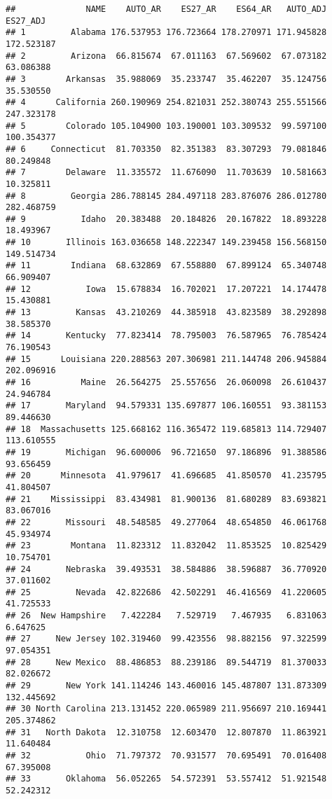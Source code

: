 \documentclass[
]{article}
\begin{document}
\begin{verbatim}
##              NAME    AUTO_AR    ES27_AR    ES64_AR   AUTO_ADJ   ES27_ADJ
## 1         Alabama 176.537953 176.723664 178.270971 171.945828 172.523187
## 2         Arizona  66.815674  67.011163  67.569602  67.073182  63.086388
## 3        Arkansas  35.988069  35.233747  35.462207  35.124756  35.530550
## 4      California 260.190969 254.821031 252.380743 255.551566 247.323178
## 5        Colorado 105.104900 103.190001 103.309532  99.597100 100.354377
## 6     Connecticut  81.703350  82.351383  83.307293  79.081846  80.249848
## 7        Delaware  11.335572  11.676090  11.703639  10.581663  10.325811
## 8         Georgia 286.788145 284.497118 283.876076 286.012780 282.468759
## 9           Idaho  20.383488  20.184826  20.167822  18.893228  18.493967
## 10       Illinois 163.036658 148.222347 149.239458 156.568150 149.514734
## 11        Indiana  68.632869  67.558880  67.899124  65.340748  66.909407
## 12           Iowa  15.678834  16.702021  17.207221  14.174478  15.430881
## 13         Kansas  43.210269  44.385918  43.823589  38.292898  38.585370
## 14       Kentucky  77.823414  78.795003  76.587965  76.785424  76.190543
## 15      Louisiana 220.288563 207.306981 211.144748 206.945884 202.096916
## 16          Maine  26.564275  25.557656  26.060098  26.610437  24.946784
## 17       Maryland  94.579331 135.697877 106.160551  93.381153  89.446630
## 18  Massachusetts 125.668162 116.365472 119.685813 114.729407 113.610555
## 19       Michigan  96.600006  96.721650  97.186896  91.388586  93.656459
## 20      Minnesota  41.979617  41.696685  41.850570  41.235795  41.804507
## 21    Mississippi  83.434981  81.900136  81.680289  83.693821  83.067016
## 22       Missouri  48.548585  49.277064  48.654850  46.061768  45.934974
## 23        Montana  11.823312  11.832042  11.853525  10.825429  10.754701
## 24       Nebraska  39.493531  38.584886  38.596887  36.770920  37.011602
## 25         Nevada  42.822686  42.502291  46.416569  41.220605  41.725533
## 26  New Hampshire   7.422284   7.529719   7.467935   6.831063   6.647625
## 27     New Jersey 102.319460  99.423556  98.882156  97.322599  97.054351
## 28     New Mexico  88.486853  88.239186  89.544719  81.370033  82.026672
## 29       New York 141.114246 143.460016 145.487807 131.873309 132.445692
## 30 North Carolina 213.131452 220.065989 211.956697 210.169441 205.374862
## 31   North Dakota  12.310758  12.603470  12.807870  11.863921  11.640484
## 32           Ohio  71.797372  70.931577  70.695491  70.016408  67.395008
## 33       Oklahoma  56.052265  54.572391  53.557412  51.921548  52.242312

\end{verbatim}
\end{document}

